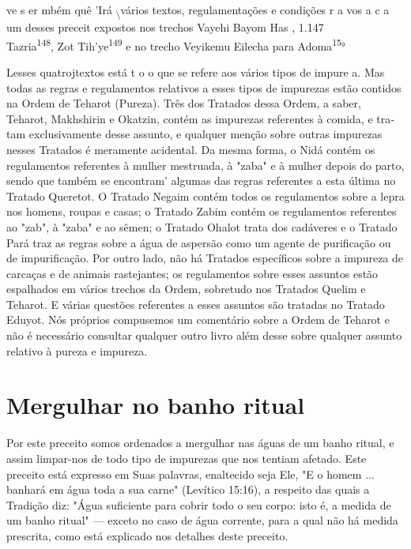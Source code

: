 \begin{itemize}
\begin{enumrate}
\begin{itemize}
\begin{itemize}
ve s er mbém quê 'Irá \textsubscript{\textbackslash{}}vários textos,
regulamentações e condições r a vos a c a um desses preceit expostos nos
trechos Vayehi Bayom Has , 1.147\\
Tazria\textsuperscript{148}, Zot Tih'ye\textsuperscript{149} e no trecho
Veyikemu Eilecha para Adoma\textsuperscript{15}°

Les­ses quatrojtextos está t o o que se refere aos vários tipos de
impure a. Mas todas as regras e regulamentos relativos a esses tipos de
impurezas estão conti­dos na Ordem de Teharot (Pureza). Três dos
Tratados dessa Ordem, a saber, Teharot, Makhshirin e Okatzin, contém as
impurezas referentes à comida, e tra­tam exclusivamente desse assunto, e
qualquer menção sobre outras impurezas nesses Tratados é meramente
acidental. Da mesma forma, o Nidá contém os regulamentos referentes à
mulher mestruada, à "zaba" e à mulher depois do parto, sendo que também
se encontram' algumas das regras referentes a esta úl­tima no Tratado
Queretot. O Tratado Negaim contém todos os regulamentos sobre a lepra
nos homens, roupas e casas; o Tratado Zabim contém os regula­mentos
referentes ao "zab", à "zaba" e ao sêmen; o Tratado Ohalot trata dos
cadáveres e o Tratado Pará traz as regras sobre a água de aspersão como
um agente de purificação ou de impurificação. Por outro lado, não há
Tratados es­pecíficos sobre a impureza de carcaças e de animais
rastejantes; os regulamen­tos sobre esses assuntos estão espalhados em
vários trechos da Ordem, sobre­tudo nos Tratados Quelim e Teharot. E
várias questões referentes a esses as­suntos são tratadas no Tratado
Eduyot. Nós próprios compusemos um comen­tário sobre a Ordem de Teharot
e não é necessário consultar qualquer outro livro além desse sobre
qualquer assunto relativo à pureza e impureza.

\section{Mergulhar no banho ritual}

Por este preceito somos ordenados a mergulhar nas águas de um ba­nho
ritual, e assim limpar-nos de todo tipo de impurezas que nos tentiam
afeta­do. Este preceito está expresso em Suas palavras, enaltecido seja
Ele, "E o ho­mem ... banhará em água toda a sua carne" (Levítico 15:16),
a respeito das quais a Tradição diz: "Água suficiente para cobrir todo o
seu corpo: isto é, a medida de um banho ritual" --- exceto no caso de
água corrente, para a qual não há medida prescrita, como está explicado
nos detalhes deste preceito.


\end{itemize}
\end{itemize}
\end{enumrate}
\end{itemize}

